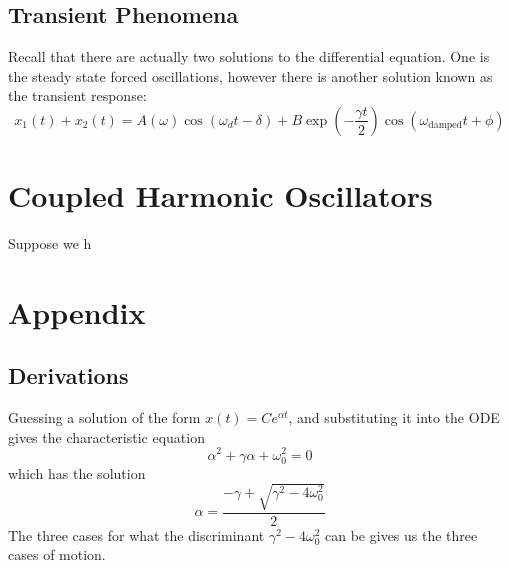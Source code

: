 \documentclass{article}
\begin{document}
\subsection{Transient Phenomena}
Recall that there are actually two solutions to the differential equation. One is the steady state forced oscillations, however there is another solution known as the transient response: 
\begin{equation}
    x_1(t)+x_2(t) = A(\omega)\cos(\omega_d t- \delta) + B\exp\left(-\frac{\gamma t}{2}\right)\cos\left(\omega_\text{damped} t + \phi\right)
\end{equation}

\newpage
\section{Coupled Harmonic Oscillators}
Suppose we h

\newpage
\section{Appendix}
\subsection{Derivations}
Guessing a solution of the form $x(t)=Ce^{\alpha t}$, and substituting it into the ODE gives the characteristic equation 
\begin{equation}
    \alpha^2 + \gamma \alpha + \omega_0^2 = 0
\end{equation}
which has the solution 
\begin{equation}
    \alpha = \frac{-\gamma + \sqrt{\gamma^2 - 4\omega_0^2}}{2}
\end{equation}
The three cases for what the discriminant $\gamma^2-4\omega_0^2$ can be gives us the three cases of motion.
\end{document}
